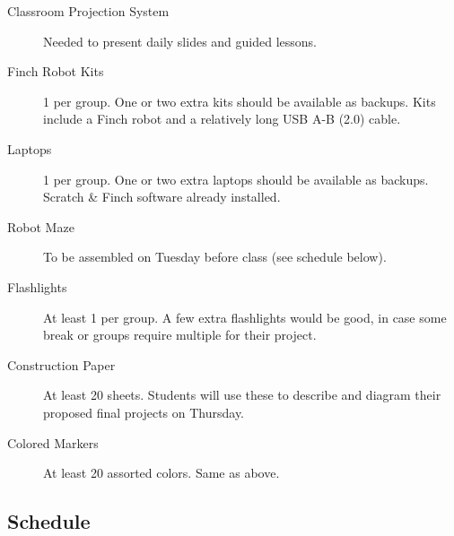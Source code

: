 \documentclass[a4paper]{article}
\begin{document}
		\begin{description}
			\item[Classroom Projection System] Needed to present daily slides and guided lessons.
			
			\item[Finch Robot Kits] 1 per group. One or two extra kits should be available as backups. Kits include a Finch robot and a relatively long USB A-B (2.0) cable.
			
			\item[Laptops] 1 per group. One or two extra laptops should be available as backups. Scratch \& Finch software already installed.
			
			\item[Robot Maze] To be assembled on Tuesday before class (see schedule below).
			
			\item[Flashlights] At least 1 per group. A few extra flashlights would be good, in case some break or groups require multiple for their project.
			
			\item[Construction Paper] At least 20 sheets. Students will use these to describe and diagram their proposed final projects on Thursday.
			
			\item[Colored Markers] At least 20 assorted colors. Same as above.
		\end{description}
	
	\newpage
	
	\subsection{Schedule}
	
\end{document}
